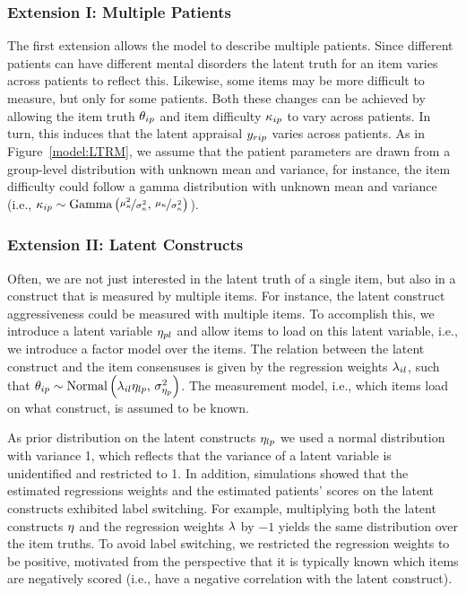 \documentclass[a4paper]{article}
\begin{document}
\subsubsection*{Extension I: Multiple Patients}
The first extension allows the model to describe multiple patients. Since different patients can have different mental disorders the latent truth for an item varies across patients to reflect this. Likewise, some items may be more difficult to measure, but only for some patients. Both these changes can be achieved by allowing the item truth $\theta_{ip}$ and item difficulty $\kappa_{ip}$ to vary across patients. In turn, this induces that the latent appraisal $y_{rip}$ varies across patients. As in Figure~\ref{model:LTRM}, we assume that the patient parameters are drawn from a group-level distribution with unknown mean and variance, for instance, the item difficulty could follow a gamma distribution with unknown mean and variance (i.e., $\kappa_{ip} \sim \text{Gamma}\left(\nicefrac{\mu_\kappa^2}{\sigma_\kappa^2},\,\nicefrac{\mu_\kappa}{\sigma_\kappa^2}\right)$).

\subsubsection*{Extension II: Latent Constructs}
Often, we are not just interested in the latent truth of a single item, but also in a construct that is measured by multiple items. For instance, the latent construct aggressiveness could be measured with multiple items. To accomplish this, we introduce a latent variable $\eta_{pl}$ and allow items to load on this latent variable, i.e., we introduce a factor model over the items. The relation between the latent construct and the item consensuses is given by the regression weights $\lambda_{il}$, such that $\theta_{ip} \sim \text{Normal}\left(\lambda_{il}\eta_{lp},\,\sigma^2_{\eta_{p}}\right)$. The measurement model, i.e., which items load on what construct, is assumed to be known.

As prior distribution on the latent constructs $\eta_{lp}$ we used a normal distribution with variance 1, which reflects that the variance of a latent variable is unidentified and restricted to 1. In addition, simulations showed that the estimated regressions weights and the estimated patients' scores on the latent constructs exhibited label switching. For example, multiplying both the latent constructs $\eta$ and the regression weights $\lambda$ by $-1$ yields the same distribution over the item truths. To avoid label switching, we restricted the regression weights to be positive, motivated from the perspective that it is typically known which items are negatively scored (i.e., have a negative correlation with the latent construct).
\end{document}
